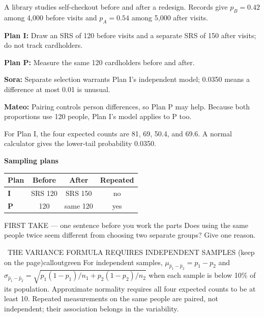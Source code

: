 \documentclass[11pt]{article}
\begin{document}
A library studies self-checkout before and after a redesign. Records give $p_B=0.42$ among 4{,}000 before visits and $p_A=0.54$ among 5{,}000 after visits.\par\smallskip \textbf{Plan I:} Draw an SRS of 120 before visits and a separate SRS of 150 after visits; do not track cardholders.\par \textbf{Plan P:} Measure the same 120 cardholders before and after.\par\smallskip \textbf{Sora:} Separate selection warrants Plan I's independent model; 0.0350 means a difference at most 0.01 is unusual.\par \textbf{Mateo:} Pairing controls person differences, so Plan P may help. Because both proportions use 120 people, Plan I's model applies to P too.\par\smallskip For Plan I, the four expected counts are 81, 69, 50.4, and 69.6. A normal calculator gives the lower-tail probability 0.0350.\par
\begin{center}
\textbf{Sampling plans}\par\smallskip
\begin{tabular}{|l|c|c|c|}
\hline
\textbf{Plan} & \textbf{Before} & \textbf{After} & \textbf{Repeated} \\ \hline
\textbf{I} & SRS 120 & SRS 150 & no \\ \hline
\textbf{P} & 120 & same 120 & yes \\ \hline
\end{tabular}
\end{center}
\begin{firsttakebox}{FIRST TAKE --- one sentence before you work the parts}
Does using the same people twice seem different from choosing two separate groups? Give one reason.\par
{}
\end{firsttakebox}

\begin{callout}{\IconBook\ THE VARIANCE FORMULA REQUIRES INDEPENDENT SAMPLES (keep on the page)}{calloutgreen}
For independent samples, $\mu_{\widehat p_1-\widehat p_2}=p_1-p_2$ and
$\sigma_{\widehat p_1-\widehat p_2}=\sqrt{p_1(1-p_1)/n_1+p_2(1-p_2)/n_2}$ when each sample is
below 10\% of its population. Approximate normality requires all four expected counts to be at least 10.
Repeated measurements on the same people are paired, not independent; their association belongs in the variability.
\end{callout}
\end{document}
